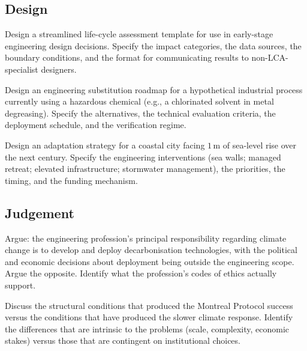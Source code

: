 \subsection*{Design}

\begin{exercise}
Design a streamlined life-cycle assessment template for use in early-stage engineering design decisions. Specify the impact categories, the data sources, the boundary conditions, and the format for communicating results to non-LCA-specialist designers.
\end{exercise}

\begin{exercise}
Design an engineering substitution roadmap for a hypothetical industrial process currently using a hazardous chemical (e.g., a chlorinated solvent in metal degreasing). Specify the alternatives, the technical evaluation criteria, the deployment schedule, and the verification regime.
\end{exercise}

\begin{exercise}
Design an adaptation strategy for a coastal city facing $1\,\text{m}$ of sea-level rise over the next century. Specify the engineering interventions (sea walls; managed retreat; elevated infrastructure; stormwater management), the priorities, the timing, and the funding mechanism.
\end{exercise}

\subsection*{Judgement}

\begin{exercise}
Argue: the engineering profession's principal responsibility regarding climate change is to develop and deploy decarbonisation technologies, with the political and economic decisions about deployment being outside the engineering scope. Argue the opposite. Identify what the profession's codes of ethics actually support.
\end{exercise}

\begin{exercise}
Discuss the structural conditions that produced the Montreal Protocol success \cite{law:montreal-protocol-1987} versus the conditions that have produced the slower climate response. Identify the differences that are intrinsic to the problems (scale, complexity, economic stakes) versus those that are contingent on institutional choices.
\end{exercise}

